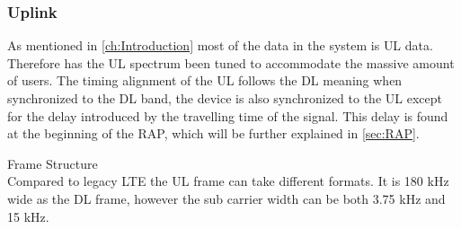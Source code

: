 \subsubsection{Uplink}
As mentioned in \autoref{ch:Introduction} most of the data in the system is \gls{UL} data. Therefore has the \gls{UL} spectrum been tuned to accommodate the massive amount of users. The timing alignment of the \gls{UL} follows the \gls{DL} meaning when synchronized to the \gls{DL} band, the device is also synchronized to the \gls{UL} except for the delay introduced by the travelling time of the signal. This delay is found at the beginning of the \gls{RAP}, which will be further explained in \autoref{sec:RAP}.

Frame Structure\\
Compared to legacy \gls{LTE} the \gls{UL} frame can take different formats. It is 180 kHz wide as the \gls{DL} frame, however the sub carrier width can be both 3.75 kHz and 15 kHz.



